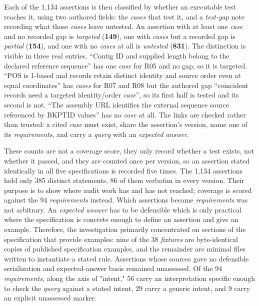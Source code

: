 Each of the 1{,}134 assertions is then classified by whether an executable test reaches it, using two authored fields: the \emph{cases} that test it, and a \emph{test-gap} note recording what those \emph{cases} leave untested.
An assertion with at least one \emph{case} and no recorded gap is \emph{targeted} (\textbf{149}), one with \emph{cases} but a recorded gap is \emph{partial} (\textbf{154}), and one with no \emph{cases} at all is \emph{untested} (\textbf{831}).
The distinction is visible in three real entries.
``Contig ID and supplied length belong to the declared reference sequence'' has one \emph{case} for R05 and no gap, so it is targeted.
``POS is 1-based and records retain distinct identity and source order even at equal coordinates'' has \emph{cases} for R07 and R08 but the authored gap ``coincident records need a targeted identity/order \emph{case}'', so its first half is tested and its second is not.
``The assembly URL identifies the external sequence source referenced by BKPTID values'' has no \emph{case} at all.
The links are checked rather than trusted: a cited \emph{case} must exist, share the assertion's version, name one of its \emph{requirements}, and carry a \emph{query} with an \emph{expected answer}.

These counts are not a coverage score, they only record whether a test exists, not whether it passed, and they are counted once per version, so an assertion stated identically in all five specifications is recorded five times.
The 1,134 assertions hold only 385 distinct statements, 86 of them verbatim in every version. 
Their purpose is to show where audit work has and has not reached; coverage is scored against the 94 \emph{requirements} instead.
Which assertions became \emph{requirements} was not arbitrary.
An \emph{expected answer} has to be defensible which is only practical where the specification is concrete enough to define an assertion and give an example.
Therefore, the investigation primarily concentrated on sections of the specification that provide examples: nine of the 38 \emph{fixtures} are byte-identical copies of published specification examples, and the remainder are minimal files written to instantiate a stated rule.
Assertions whose sources gave no defensible serialization and expected-answer basis remained unassessed.
Of the 94 \emph{requirements}, along the axis of "intent," 56 carry an interpretation specific enough to check the \emph{query} against a stated intent, 29 carry a generic intent, and 9 carry an explicit unassessed marker.


